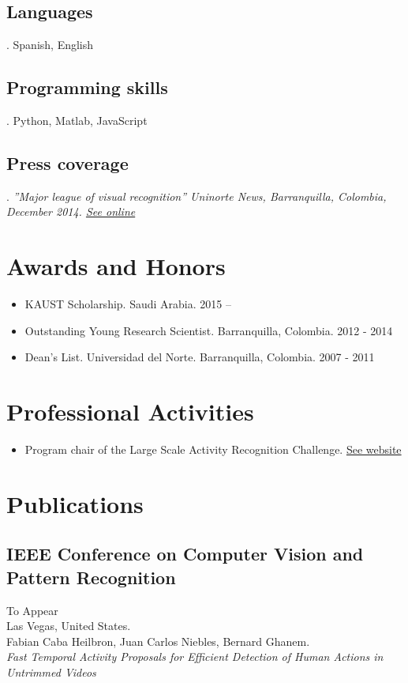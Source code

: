 \documentclass[letterpaper,10pt]{article}
\begin{document}
\subsection{Languages}. Spanish, English
\subsection{Programming skills}. Python, Matlab, JavaScript
\subsection{Press coverage}. \emph{”Major league of visual recognition” Uninorte News, Barranquilla, Colombia, December 2014. \href{http://www.uninorte.edu.co/web/grupo-prensa/noticia?articleId=4092257&groupId=73923}{See online}}

\section{Awards and Honors}

\begin{itemize}
  \item KAUST Scholarship. Saudi Arabia. \hfill 2015 – 
  \item Outstanding Young Research Scientist. Barranquilla, Colombia. \hfill 2012 - 2014
  \item Dean’s List. Universidad del Norte. Barranquilla, Colombia. \hfill 2007 - 2011
\end{itemize}

\section{Professional Activities}

\begin{itemize}
 \item Program chair of the Large Scale Activity Recognition Challenge. \href{http://activity-net.org/challenges/2016/}{See website} 
\end{itemize}

\pagebreak


\section{Publications}

\subsection{IEEE Conference on Computer Vision and Pattern Recognition} \hfill To Appear \\
Las Vegas, United States. \\
Fabian Caba Heilbron, Juan Carlos Niebles, Bernard Ghanem. \\
\textit{Fast Temporal Activity Proposals for Efficient Detection of Human Actions in Untrimmed Videos}
\end{document}
